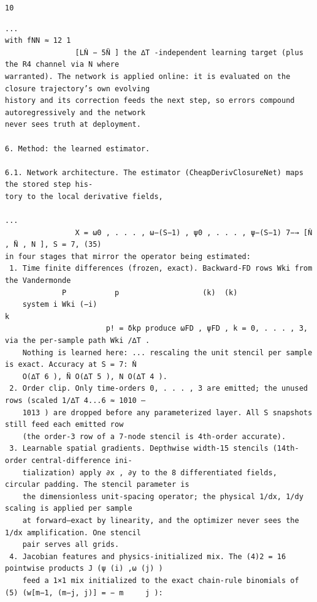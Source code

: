 \documentclass[letterpaper]{article}
\begin{document}
\begin{Verbatim}[fontsize=\fontsize{6.35}{7.15}\selectfont,breaklines=false]
                                                                          10
\end{Verbatim}
\newpage
\begin{Verbatim}[fontsize=\fontsize{6.35}{7.15}\selectfont,breaklines=false]
                                                                                           ...
with fNN ≈ 12 1
                [LṄ − 5N̈ ] the ∆T -independent learning target (plus the R4 channel via N where
warranted). The network is applied online: it is evaluated on the closure trajectory’s own evolving
history and its correction feeds the next step, so errors compound autoregressively and the network
never sees truth at deployment.

6. Method: the learned estimator.

6.1. Network architecture. The estimator (CheapDerivClosureNet) maps the stored step his-
tory to the local derivative fields,
                                                                             ...
                X = ω0 , . . . , ω−(S−1) , ψ0 , . . . , ψ−(S−1) 7−→ [Ṅ , N̈ , N ], S = 7, (35)
in four stages that mirror the operator being estimated:
 1. Time finite differences (frozen, exact). Backward-FD rows Wki from the Vandermonde
             P           p                   (k)  (k)
    system i Wki (−i)                                                                                 k
                       p! = δkp produce ωFD , ψFD , k = 0, . . . , 3, via the per-sample path Wki /∆T .
    Nothing is learned here: ... rescaling the unit stencil per sample is exact. Accuracy at S = 7: Ṅ
    O(∆T 6 ), N̈ O(∆T 5 ), N O(∆T 4 ).
 2. Order clip. Only time-orders 0, . . . , 3 are emitted; the unused rows (scaled 1/∆T 4...6 ≈ 1010 –
    1013 ) are dropped before any parameterized layer. All S snapshots still feed each emitted row
    (the order-3 row of a 7-node stencil is 4th-order accurate).
 3. Learnable spatial gradients. Depthwise width-15 stencils (14th-order central-difference ini-
    tialization) apply ∂x , ∂y to the 8 differentiated fields, circular padding. The stencil parameter is
    the dimensionless unit-spacing operator; the physical 1/dx, 1/dy scaling is applied per sample
    at forward—exact by linearity, and the optimizer never sees the 1/dx amplification. One stencil
    pair serves all grids.
 4. Jacobian features and physics-initialized mix. The (4)2 = 16 pointwise products J (ψ (i) ,ω (j) )
    feed a 1×1 mix initialized to the exact chain-rule binomials of (5) (w[m−1, (m−j, j)] = − m     j ):

\end{Verbatim}
\end{document}
